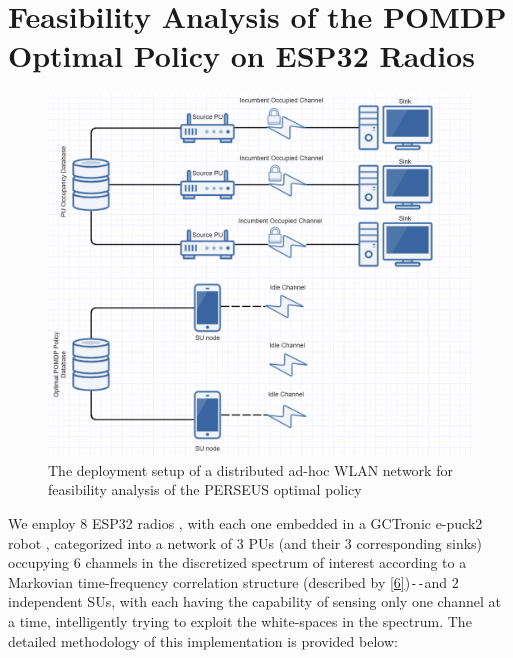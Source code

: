 \documentclass[12pt, draftcls, onecolumn]{IEEEtran}
\begin{document}
\section{Feasibility Analysis of the POMDP Optimal Policy on ESP32 Radios}\label{D}
\begin{figure} [htb]
    \centerline{
    \includegraphics[width = 1.0\textwidth]{ESP32_Deployment.PNG}}
    \caption{The deployment setup of a distributed ad-hoc WLAN network for feasibility analysis of the PERSEUS optimal policy}
    \label{fig: C. 0}
\end{figure}
We employ $8$ ESP32 radios \cite{Espressif:ESP32}, with each one embedded in a GCTronic e-puck2 robot \cite{GCTronic:epuck2}, categorized into a network of $3$ PUs (and their $3$ corresponding sinks) occupying $6$ channels in the discretized spectrum of interest according to a Markovian time-frequency correlation structure (described by \eqref{6})\texttt{-{}-}and $2$ independent SUs, with each having the capability of sensing only one channel at a time, intelligently trying to exploit the white-spaces in the spectrum. The detailed methodology of this implementation is provided below:
\end{document}
